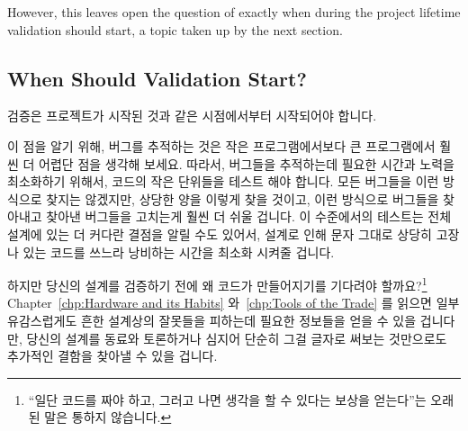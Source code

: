 However, this leaves open the question of exactly when during the project
lifetime validation should start, a topic taken up by the next section.
\fi

\subsection{When Should Validation Start?}
\label{sec:debugging:When Should Validation Start?}

검증은 프로젝트가 시작된 것과 같은 시점에서부터 시작되어야 합니다.

이 점을 알기 위해, 버그를 추적하는 것은 작은 프로그램에서보다 큰 프로그램에서
훨씬 더 어렵단 점을 생각해 보세요.
따라서, 버그들을 추적하는데 필요한 시간과 노력을 최소화하기 위해서, 코드의 작은
단위들을 테스트 해야 합니다.
모든 버그들을 이런 방식으로 찾지는 않겠지만, 상당한 양을 이렇게 찾을 것이고,
이런 방식으로 버그들을 찾아내고 찾아낸 버그들을 고치는게 훨씬 더 쉬울 겁니다.
이 수준에서의 테스트는 전체 설계에 있는 더 커다란 결점을 알릴 수도 있어서,
설계로 인해 문자 그대로 상당히 고장나 있는 코드를 쓰느라 낭비하는 시간을 최소화
시켜줄 겁니다.

하지만 당신의 설계를 검증하기 전에 왜 코드가 만들어지기를 기다려야
할까요?\footnote{
	``일단 코드를 짜야 하고, 그러고 나면 생각을 할 수 있다는 보상을
	얻는다''는 오래된 말은 통하지 않습니다.}
Chapter~\ref{chp:Hardware and its Habits}
와~\ref{chp:Tools of the Trade} 를 읽으면 일부 유감스럽게도 흔한 설계상의
잘못들을 피하는데 필요한 정보들을 얻을 수 있을 겁니다만, 당신의 설계를 동료와
토론하거나 심지어 단순히 그걸 글자로 써보는 것만으로도 추가적인 결함을 찾아낼
수 있을 겁니다.

